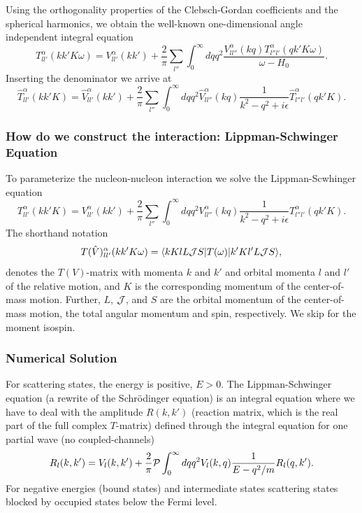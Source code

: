 \documentclass[compress]{beamer}
\newcommand*{\ket}[1]{|#1\rangle}
\newcommand*{\bra}[1]{\langle#1|}
\begin{document}
\frame
{
\begin{small}
{\scriptsize

Using the orthogonality
properties of the Clebsch-Gordan coefficients and the spherical harmonics,
we obtain the well-known
one-dimensional angle independent
integral equation
\[
   T_{ll'}^{\alpha}(kk'K\omega)=V_{ll'}^{\alpha}(kk')
   +\frac{2}{\pi}\sum_{l''}\int_{0}^{\infty} dqq^2
   \frac{V_{ll''}^{\alpha}(kq)
   T_{l''l'}^{\alpha}(qk'K\omega)}
   {\omega -H_0}.
\]
Inserting the denominator we arrive at 
\[
   \hat{T}_{ll'}^{\alpha}(kk'K)=\hat{V}_{ll'}^{\alpha}(kk')
   +\frac{2}{\pi}\sum_{l''}\int_{0}^{\infty} dqq^2
   \hat{V}_{ll''}^{\alpha}(kq)
   \frac{1}{k^2-q^2 +i\epsilon}
   \hat{T}_{l''l'}^{\alpha}(qk'K).
\]
}
\end{small}

}


\frame
{
\frametitle{How do we construct the interaction: Lippman-Schwinger Equation}
\begin{small}
{\scriptsize
To parameterize the nucleon-nucleon interaction we solve the Lippman-Scwhinger
equation
\[
   T_{ll'}^{\alpha}(kk'K)=V_{ll'}^{\alpha}(kk')
   +\frac{2}{\pi}\sum_{l''}\int_{0}^{\infty} dqq^2
   V_{ll''}^{\alpha}(kq)
   \frac{1}{k^2-q^2 +i\epsilon}
   T_{l''l'}^{\alpha}(qk'K).
\]
The  shorthand notation
\[
    T(\hat{V})_{ll'}^{\alpha}(kk'K\omega)=
   \bra{kKlL{\cal J}S}T(\omega)\ket{k'Kl'L{\cal J}S},
\]
denotes the $T(V)$-matrix
with momenta $k$ and $k'$ and orbital momenta $l$ and $l'$
of the relative motion, and
$K$ is the corresponding momentum of
the center-of-mass motion. Further, $L$, ${\cal J}$, and $S$
are the orbital momentum of the center-of-mass motion, the
total angular momentum and
spin, respectively. We skip for the moment isospin.
}
\end{small}
}

\frame
{
\frametitle{Numerical Solution}
\begin{small}
{\scriptsize


For scattering states, the energy is positive, $E>0$. 
The Lippman-Schwinger equation (a rewrite of the Schr\"odinger equation)
is an integral equation
where we have to deal with the amplitude 
$R(k,k')$ (reaction matrix, which is the real part of  the full
complex $T$-matrix)
defined through the integral equation for one partial wave (no coupled-channels) 
\[
    R_l(k,k') = V_l(k,k') +\frac{2}{\pi}{\cal P}
                \int_0^{\infty}dqq^2V_l(k,q)\frac{1}{E-q^2/m}R_l(q,k').
   \label{eq:ls1}
\]
For negative energies (bound states) and intermediate states scattering states blocked
by  occupied states below the Fermi level.

}
\end{small}
}
\end{document}

